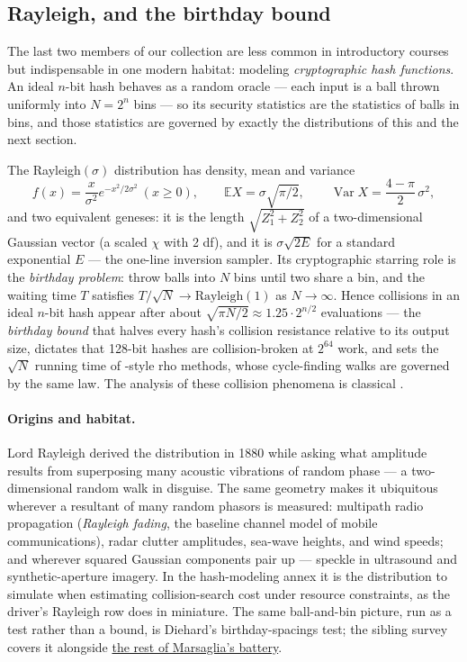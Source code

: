 \documentclass[11pt]{article}
\numberwithin{equation}{section}
\newcommand{\sisterurl}{https://sanya-shopper.github.io/randtests/}
\newcommand{\E}{\mathbb{E}}
\newcommand{\Var}{\operatorname{Var}}
\begin{document}
\subsection{Rayleigh, and the birthday bound}\label{sec:rayleigh}

The last two members of our collection are less common in introductory
courses but indispensable in one modern habitat: modeling
\emph{cryptographic hash functions}.  An ideal $n$-bit hash behaves as a
random oracle --- each input is a ball thrown uniformly into $N=2^n$ bins
--- so its security statistics are the statistics of balls in bins, and
those statistics are governed by exactly the distributions of this and
the next section.

The Rayleigh$(\sigma)$ distribution has density, mean and variance
\[
f(x)=\frac{x}{\sigma^2}e^{-x^2/2\sigma^2}\ (x\ge 0),\qquad
\E X = \sigma\sqrt{\pi/2},\qquad
\Var X = \frac{4-\pi}{2}\,\sigma^2 ,
\]
and two equivalent geneses: it is the length $\sqrt{Z_1^2+Z_2^2}$ of a
two-dimensional Gaussian vector (a scaled $\chi$ with 2 df), and it is
$\sigma\sqrt{2E}$ for a standard exponential $E$ --- the one-line
inversion sampler.  Its cryptographic starring role is the
\emph{birthday problem}: throw balls into $N$ bins until two share a bin,
and the waiting time $T$ satisfies $T/\sqrt{N}\to\mathrm{Rayleigh}(1)$ as
$N\to\infty$.  Hence collisions in an ideal $n$-bit hash appear after
about $\sqrt{\pi N/2}\approx 1.25\cdot 2^{n/2}$ evaluations --- the
\emph{birthday bound} that halves every hash's collision resistance
relative to its output size, dictates that 128-bit hashes are
collision-broken at $2^{64}$ work, and sets the $\sqrt{N}$ running time
of \citet{pollard1975}-style rho methods, whose cycle-finding walks are
governed by the same law.  The analysis of these collision phenomena is
classical \citep[\S6.4]{knuth1997}.

\paragraph{Origins and habitat.}
Lord Rayleigh derived the distribution in 1880 while asking what
amplitude results from superposing many acoustic vibrations of random
phase \citep{rayleigh1880} --- a two-dimensional random walk in disguise.
The same geometry makes it ubiquitous wherever a resultant of many
random phasors is measured: multipath radio propagation
(\emph{Rayleigh fading}, the baseline channel model of mobile
communications), radar clutter amplitudes, sea-wave heights, and wind
speeds; and wherever squared Gaussian components pair up --- speckle in
ultrasound and synthetic-aperture imagery.  In the hash-modeling annex
it is the distribution to simulate when estimating collision-search cost
under resource constraints, as the driver's Rayleigh row does in
miniature.  The same ball-and-bin picture, run as a test rather than a
bound, is Diehard's birthday-spacings test; the sibling survey covers it
alongside \href{\sisterurl diehard.html}{the rest of Marsaglia's battery}.
\end{document}
